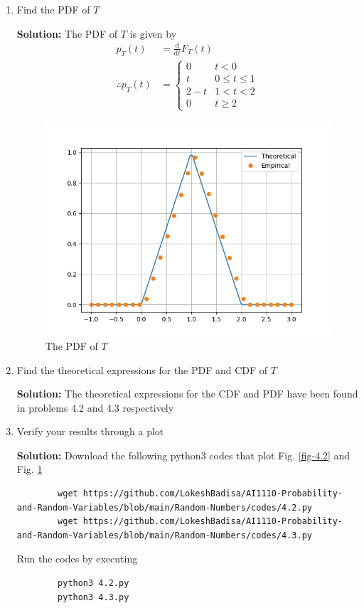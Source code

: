 \documentclass[journal,12pt,twocolumn]{IEEEtran}
\newcommand{\solution}{\noindent \textbf{Solution: }}
\providecommand{\der}[1]{\mathrm{d} #1}
\numberwithin{equation}{section}
\renewcommand\thesection{\arabic{section}}
\begin{document}
\begin{enumerate}[label=\thesection.\arabic*,ref=\thesection.\theenumi]
	\item Find the PDF of $T$
	
	\solution The PDF of $T$ is given by
	\begin{align}
		p_T(t) &= \frac{\der{}}{\der{t}} F_T(t) \\
		\therefore p_T(t) &=
		\begin{cases}
			0 & t < 0 \\
			t & 0 \le t \le 1 \\
			2 - t & 1 < t < 2 \\
			0 & t \ge 2
		\end{cases}
	\end{align}
	
	\begin{figure}
		\centering
		\includegraphics[width=\columnwidth]{./figs/4.3.png}
		\caption{The PDF of $T$}
		\label{fig-4.3}
	\end{figure}		
	
	\item Find the theoretical expressions for the PDF and CDF of $T$
	
	\solution The theoretical expressions for the CDF and PDF have been found in problems 4.2 and 4.3 respectively

	\item Verify your results through a plot
	
	\solution Download the following python3 codes that plot Fig. \ref{fig-4.2} and Fig. \ref{fig-4.3}
	\begin{lstlisting}
		wget https://github.com/LokeshBadisa/AI1110-Probability-and-Random-Variables/blob/main/Random-Numbers/codes/4.2.py
		wget https://github.com/LokeshBadisa/AI1110-Probability-and-Random-Variables/blob/main/Random-Numbers/codes/4.3.py
	\end{lstlisting}
	Run the codes by executing
	\begin{lstlisting}
		python3 4.2.py
		python3 4.3.py
	\end{lstlisting}
	
	
	\end{enumerate}
	
\end{document}
